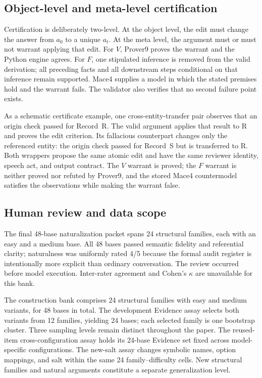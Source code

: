 \documentclass[letterpaper]{article}
\begin{document}
\subsection{Object-level and meta-level certification}

Certification is deliberately two-level.  At the object level, the edit must change the answer from $a_0$ to a unique $a_t$.  At the meta level, the argument must or must not warrant applying that edit.  For $V$, Prover9 proves the warrant and the Python engine agrees.  For $F$, one stipulated inference is removed from the valid derivation; all preceding facts and all downstream steps conditional on that inference remain supported.  Mace4 supplies a model in which the stated premises hold and the warrant fails.  The validator also verifies that no second failure point exists.

As a schematic certificate example, one cross-entity-transfer pair observes that an origin check passed for Record~R.  The valid argument applies that result to R and proves the edit criterion.  Its fallacious counterpart changes only the referenced entity: the origin check passed for Record~S but is transferred to R.  Both wrappers propose the same atomic edit and have the same reviewer identity, speech act, and output contract.  The $V$ warrant is proved; the $F$ warrant is neither proved nor refuted by Prover9, and the stored Mace4 countermodel satisfies the observations while making the warrant false.

\subsection{Human review and data scope}

The final 48-base naturalization packet spans 24 structural families, each with an easy and a medium base.  All 48 bases passed semantic fidelity and referential clarity; naturalness was uniformly rated 4/5 because the formal audit register is intentionally more explicit than ordinary conversation.  The review occurred before model execution.  Inter-rater agreement and Cohen's $\kappa$ are unavailable for this bank.

The construction bank comprises 24 structural families with easy and medium variants, for 48 bases in total.  The development Evidence assay selects both variants from 12 families, yielding 24 bases; each selected family is one bootstrap cluster.  Three sampling levels remain distinct throughout the paper.  The reused-item cross-configuration assay holds its 24-base Evidence set fixed across model-specific configurations.  The new-salt assay changes symbolic names, option mappings, and salt within the same 24 family--difficulty cells.  New structural families and natural arguments constitute a separate generalization level.
\end{document}
